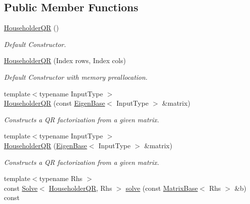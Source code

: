 \subsection*{Public Member Functions}
\begin{DoxyCompactItemize}
\item 
\mbox{\hyperlink{class_eigen_1_1_householder_q_r_a974adb10a0e066057aeb3b360df68380}{Householder\+QR}} ()
\begin{DoxyCompactList}\small\item\em Default Constructor. \end{DoxyCompactList}\item 
\mbox{\hyperlink{class_eigen_1_1_householder_q_r_a1087457610c53e1574de521a51de0cd3}{Householder\+QR}} (Index rows, Index cols)
\begin{DoxyCompactList}\small\item\em Default Constructor with memory preallocation. \end{DoxyCompactList}\item 
{\footnotesize template$<$typename Input\+Type $>$ }\\\mbox{\hyperlink{class_eigen_1_1_householder_q_r_afa7cfb4faa89195c4dc8d196924c8230}{Householder\+QR}} (const \mbox{\hyperlink{struct_eigen_1_1_eigen_base}{Eigen\+Base}}$<$ Input\+Type $>$ \&matrix)
\begin{DoxyCompactList}\small\item\em Constructs a QR factorization from a given matrix. \end{DoxyCompactList}\item 
{\footnotesize template$<$typename Input\+Type $>$ }\\\mbox{\hyperlink{class_eigen_1_1_householder_q_r_a95a53f8479ee147d7b0ccab71c13e45d}{Householder\+QR}} (\mbox{\hyperlink{struct_eigen_1_1_eigen_base}{Eigen\+Base}}$<$ Input\+Type $>$ \&matrix)
\begin{DoxyCompactList}\small\item\em Constructs a QR factorization from a given matrix. \end{DoxyCompactList}\item 
{\footnotesize template$<$typename Rhs $>$ }\\const \mbox{\hyperlink{class_eigen_1_1_solve}{Solve}}$<$ \mbox{\hyperlink{class_eigen_1_1_householder_q_r}{Householder\+QR}}, Rhs $>$ \mbox{\hyperlink{class_eigen_1_1_householder_q_r_a3e8e56769bbaaed0616ad98c4ff99c7b}{solve}} (const \mbox{\hyperlink{class_eigen_1_1_matrix_base}{Matrix\+Base}}$<$ Rhs $>$ \&b) const
\item 

\end{DoxyCompactItemize}
